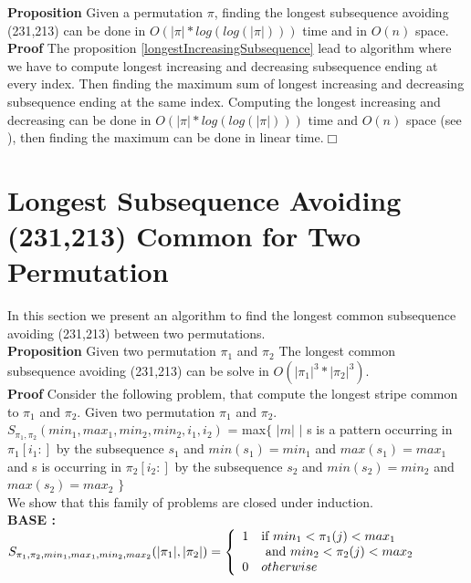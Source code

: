 \documentclass[a4paper]{llncs}
\newcommand{\ptext}{\pi}
\newcounter{num}
\newcommand{\num}{\stepcounter{num} }
\begin{document}
	\textbf{Proposition  \num \thenum}
	Given a permutation $\pi$, 
	finding the longest subsequence avoiding (231,213)
	can be done in $O(|\ptext|*log(log(|\ptext|)))$ time and in $O(n)$ space.\\
	
	\textbf{Proof} The proposition \ref{longestIncreasingSubsequence} lead to algorithm 
	where we have to compute longest increasing and decreasing subsequence ending at every index. Then finding the maximum sum of longest increasing and decreasing subsequence ending at the same index.
	Computing the longest increasing and decreasing can be done in $O(|\ptext|*log(log(|\ptext|)))$ time and $O(n)$ space (see \cite{Bespamyatnikh00enumeratinglongest}), then finding the maximum can be done in linear time.$\Box$\\



	\section{Longest Subsequence Avoiding \\(231,213) Common for Two Permutation}
	
	In this section we present an algorithm to find 
	the longest common subsequence avoiding (231,213) 
	between two permutations.\\
	
	\textbf{Proposition \num \thenum } Given two permutation $\pi_1$ and $\pi_2$
	The longest common subsequence
	avoiding (231,213) can be solve in $O(|\pi_1|^3*|\pi_2|^3)$.\\
	
	\textbf{Proof } Consider the following problem, 
	that compute the longest stripe common to $\pi_1$ and $\pi_2$.
	Given two permutation $\pi_1$ and $\pi_2$.\\
	
	$S_{\pi_1,\pi_2}(min_1,max_1,min_2,min_2,i_1,i_2)$
	= max$\{$ $|m|$ $|$ 
	s is a pattern occurring 
	in  $\pi_1[i_1:]$
	by the subsequence $s_1$ and $min(s_1)=min_1$ and $max(s_1)=max_1$
	and s is occurring
	in  $\pi_2[i_2:]$
	by the subsequence $s_2$ and $min(s_2)=min_2$ and $max(s_2)=max_2$	
	$\}$\\
	
	We show that this family of problems are closed under induction.\\


	\textbf{BASE :} \\
	$S_{\pi_1,\pi_2,min_1,max_1,min_2,max_2}(|\pi_1|,|\pi_2|) = \left\{ 
			\begin{array}{l l}
				1 & \text{if $min_1<\pi_1(j)<max_1$  
				}\\
				& \text{ and $min_2<\pi_2(j)<max_2$}\\
				0 & otherwise\\
			\end{array} \right. $\\	
\end{document}
